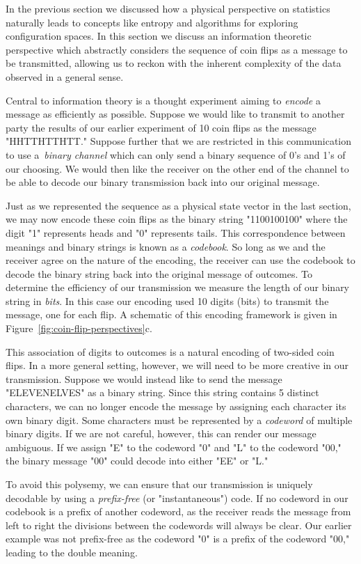 In the previous section we discussed how a physical perspective on statistics naturally leads to concepts like entropy and algorithms for exploring configuration spaces. In this section we discuss an information theoretic perspective which abstractly considers the sequence of coin flips as a message to be transmitted, allowing us to reckon with the inherent complexity of the data observed in a general sense. 

Central to information theory is a thought experiment aiming to \emph{encode} a message as efficiently as possible. Suppose we would like to transmit to another party the results of our earlier experiment of 10 coin flips as the message "HHTTHTTHTT." Suppose further that we are restricted in this communication to use a~\emph{binary channel} which can only send a binary sequence of 0's and 1's of our choosing. We would then like the receiver on the other end of the channel to be able to decode our binary transmission back into our original message. 

Just as we represented the sequence as a physical state vector in the last section, we may now encode these coin flips as the binary string "1100100100" where the digit "1" represents heads and "0" represents tails. This correspondence between meanings and binary strings is known as a \emph{codebook}. So long as we and the receiver agree on the nature of the encoding, the receiver can use the codebook to decode the binary string back into the original message of outcomes. To determine the efficiency of our transmission we measure the length of our binary string in \emph{bits}. In this case our encoding used 10 digits (bits) to transmit the message, one for each flip. A schematic of this encoding framework is given in Figure~\ref{fig:coin-flip-perspectives}c.

This association of digits to outcomes is a natural encoding of two-sided coin flips. In a more general setting, however, we will need to be more creative in our transmission. Suppose we would instead like to send the message "ELEVENELVES" as a binary string. Since this string contains 5 distinct characters, we can no longer encode the message by assigning each character its own binary digit. Some characters must be represented by a \emph{codeword} of multiple binary digits. If we are not careful, however, this can render our message ambiguous. If we assign "E" to the codeword "0" and "L" to the codeword "00," the binary message "00" could decode into either "EE" or "L." 

To avoid this polysemy, we can ensure that our transmission is uniquely decodable by using a \emph{prefix-free} (or "instantaneous") code. If no codeword in our codebook is a prefix of another codeword, as the receiver reads the message from left to right the divisions between the codewords will always be clear. Our earlier example was not prefix-free as the codeword "0" is a prefix of the codeword "00," leading to the double meaning. 

